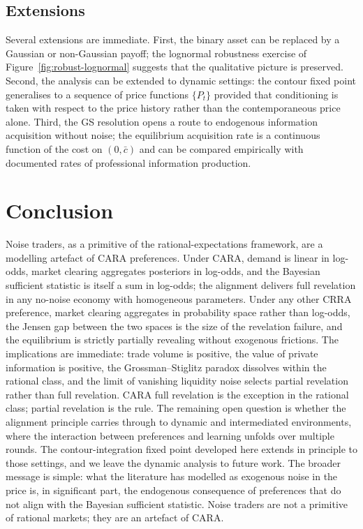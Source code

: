 \documentclass[12pt,letterpaper]{article}
\theoremstyle{definition}
\theoremstyle{remark}
\newcommand{\1}{\mathbf{1}}
\begin{document}
\subsection{Extensions}

Several extensions are immediate. First, the binary asset can be replaced
by a Gaussian or non-Gaussian payoff; the lognormal robustness exercise of
Figure~\ref{fig:robust-lognormal} suggests that the qualitative picture is
preserved. Second, the analysis can be extended to dynamic settings: the
contour fixed point generalises to a sequence of price functions
$\{P_{t}\}$ provided that conditioning is taken with respect to the price
history rather than the contemporaneous price alone. Third, the GS
resolution opens a route to endogenous information acquisition without
noise; the equilibrium acquisition rate is a continuous function of the
cost on $(0,\bar c)$ and can be compared empirically with documented rates
of professional information production.

\section{Conclusion}\label{sec:conclusion}

Noise traders, as a primitive of the rational-expectations framework, are
a modelling artefact of CARA preferences. Under CARA, demand is linear in
log-odds, market clearing aggregates posteriors in log-odds, and the
Bayesian sufficient statistic is itself a sum in log-odds; the alignment
delivers full revelation in any no-noise economy with homogeneous
parameters. Under any other CRRA preference, market clearing aggregates
in probability space rather than log-odds, the Jensen gap between the two
spaces is the size of the revelation failure, and the equilibrium is
strictly partially revealing without exogenous frictions. The implications
are immediate: trade volume is positive, the value of private information
is positive, the Grossman--Stiglitz paradox dissolves within the rational
class, and the limit of vanishing liquidity noise selects partial
revelation rather than full revelation. CARA full revelation is the
exception in the rational class; partial revelation is the rule. The
remaining open question is whether the alignment principle carries
through to dynamic and intermediated environments, where the interaction
between preferences and learning unfolds over multiple rounds. The
contour-integration fixed point developed here extends in principle to
those settings, and we leave the dynamic analysis to future work. The
broader message is simple: what the literature has modelled as exogenous
noise in the price is, in significant part, the endogenous consequence
of preferences that do not align with the Bayesian sufficient statistic.
Noise traders are not a primitive of rational markets; they are an
artefact of CARA.
\end{document}
